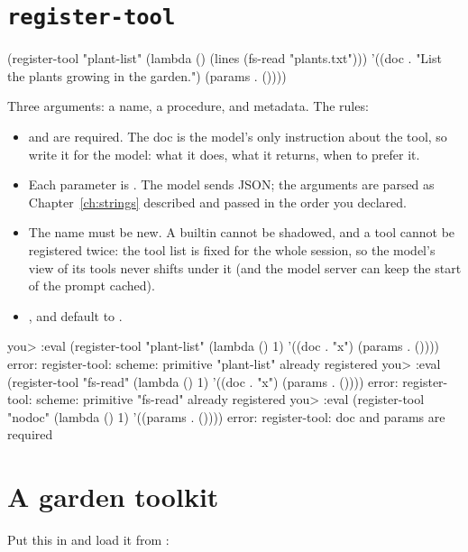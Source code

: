 \section{\texttt{register-tool}}

\begin{scm}
(register-tool "plant-list"
  (lambda () (lines (fs-read "plants.txt")))
  '((doc . "List the plants growing in the garden.")
    (params . ())))
\end{scm}

Three arguments: a name, a procedure, and metadata. The rules:

\begin{itemize}
  \item {} and  are required. The doc is the model's
    only instruction about the tool, so write it for the model: what it
    does, what it returns, when to prefer it.
  \item Each parameter is . The model sends JSON; the
    arguments are parsed as Chapter~\ref{ch:strings} described and passed
    in the order you declared.
  \item The name must be new. A builtin cannot be shadowed, and a tool
    cannot be registered twice: the tool list is fixed for the whole
    session, so the model's view of its tools never shifts under it (and
    the model server can keep the start of the prompt cached).
  \item {},  and  default to
    .
\end{itemize}

\begin{txt}
you> :eval (register-tool "plant-list" (lambda () 1) '((doc . "x") (params . ())))
error: register-tool: scheme: primitive "plant-list" already registered
you> :eval (register-tool "fs-read" (lambda () 1) '((doc . "x") (params . ())))
error: register-tool: scheme: primitive "fs-read" already registered
you> :eval (register-tool "nodoc" (lambda () 1) '((params . ())))
error: register-tool: doc and params are required
\end{txt}

\section{A garden toolkit}

Put this in  and load it from :

